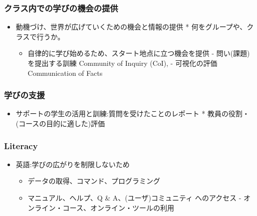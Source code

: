 \documentclass[
]{book}
\providecommand{\tightlist}{%
  \setlength{\itemsep}{0pt}\setlength{\parskip}{0pt}}
\theoremstyle{definition}
\theoremstyle{definition}
\theoremstyle{definition}
\theoremstyle{definition}
\theoremstyle{remark}
\begin{document}
\hypertarget{ux30afux30e9ux30b9ux5185ux3067ux306eux5b66ux3073ux306eux6a5fux4f1aux306eux63d0ux4f9b}{%
\subsubsection{クラス内での学びの機会の提供}\label{ux30afux30e9ux30b9ux5185ux3067ux306eux5b66ux3073ux306eux6a5fux4f1aux306eux63d0ux4f9b}}

\begin{itemize}
\tightlist
\item
  動機づけ、世界が広げていくための機会と情報の提供 * 何をグループや、クラスで行うか。

  \begin{itemize}
  \tightlist
  \item
    自律的に学び始めるため、スタート地点に立つ機会を提供 - 問い(課題)を提出する訓練 Community of Inquiry (CoI), - 可視化の評価 Communication of Facts
  \end{itemize}
\end{itemize}

\hypertarget{ux5b66ux3073ux306eux652fux63f4}{%
\subsubsection{学びの支援}\label{ux5b66ux3073ux306eux652fux63f4}}

\begin{itemize}
\tightlist
\item
  サポートの学生の活用と訓練:質問を受けたことのレポート * 教員の役割・(コースの目的に適した)評価
\end{itemize}

\hypertarget{literacy}{%
\subsubsection{Literacy}\label{literacy}}

\begin{itemize}
\tightlist
\item
  英語:学びの広がりを制限しないため

  \begin{itemize}
  \tightlist
  \item
    データの取得、コマンド、プログラミング
  \item
    マニュアル、ヘルプ、Q \& A、(ユーザ)コミュニティ へのアクセス - オンライン・コース、オンライン・ツールの利用
  \end{itemize}
\end{itemize}
\end{document}
